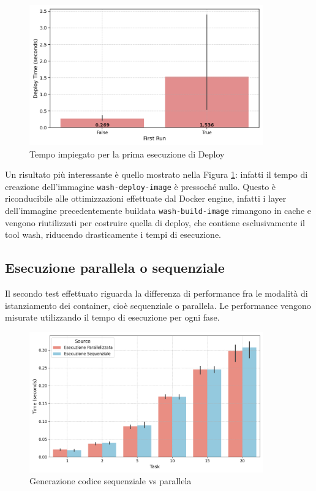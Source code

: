 \FloatBarrier
\begin{figure}[h]
    \centering
    \includegraphics[width=0.9\textwidth]{img/plots/barplot_startup_deploy.png}
    \caption{Tempo impiegato per la prima esecuzione di Deploy}
    \label{fig:test_startup_deploy}
\end{figure}
\FloatBarrier

Un risultato più interessante è quello mostrato nella Figura \ref{fig:test_startup_deploy}: infatti il tempo di creazione dell'immagine \texttt{wash-deploy-image} è pressoché nullo. Questo è riconducibile alle ottimizzazioni effettuate dal Docker engine, infatti i layer dell'immagine precedentemente buildata \texttt{wash-build-image} rimangono in cache e vengono riutilizzati per costruire quella di deploy, che contiene esclusivamente il tool wash, riducendo drasticamente i tempi di esecuzione.

\subsection{Esecuzione parallela o sequenziale}

Il secondo test effettuato riguarda la differenza di performance fra le modalità di istanziamento dei container, cioè sequenziale o parallela. Le performance vengono misurate utilizzando il tempo di esecuzione per ogni fase.

\FloatBarrier
\begin{figure}[ht!]
    \centering
    \includegraphics[width=0.9\textwidth]{img/plots/gen_time_paired_barplot.png}
    \caption{Generazione codice sequenziale vs parallela}
    \label{fig:test_seq_par_gen}
\end{figure}
\FloatBarrier

